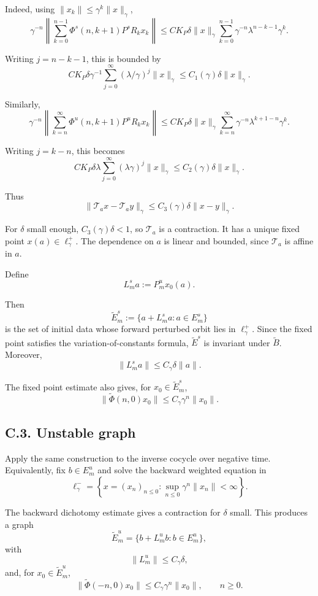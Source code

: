 \documentclass[12pt,a4paper]{article}
\theoremstyle{plain}
\numberwithin{equation}{section}
\numberwithin{theorem}{section}
\begin{document}
Indeed, using $\|x_k\|\le\gamma^k\|x\|_\gamma$,
\[
\gamma^{-n}
\left\|
\sum_{k=0}^{n-1}
\Phi^s(n,k+1)P^sR_kx_k
\right\|
\le
C K_P\delta\|x\|_\gamma
\sum_{k=0}^{n-1}
\gamma^{-n}\lambda^{n-k-1}
\gamma^k.
\]

Writing $j=n-k-1$, this is bounded by
\[
C K_P\delta\gamma^{-1}
\sum_{j=0}^{\infty}(\lambda/\gamma)^j
\|x\|_\gamma
\le
C_1(\gamma)\delta\|x\|_\gamma.
\]

Similarly,
\[
\gamma^{-n}
\left\|
\sum_{k=n}^{\infty}
\Phi^u(n,k+1)P^uR_kx_k
\right\|
\le
C K_P\delta\|x\|_\gamma
\sum_{k=n}^{\infty}
\gamma^{-n}\lambda^{k+1-n}
\gamma^k.
\]

Writing $j=k-n$, this becomes
\[
C K_P\delta\lambda
\sum_{j=0}^{\infty}(\lambda\gamma)^j
\|x\|_\gamma
\le
C_2(\gamma)\delta\|x\|_\gamma.
\]

Thus
\[
\|\mathcal T_a x-\mathcal T_a y\|_\gamma
\le
C_3(\gamma)\delta\|x-y\|_\gamma.
\]

For $\delta$ small enough, $C_3(\gamma)\delta<1$, so $\mathcal T_a$ is a contraction. It has a unique fixed point $x(a)\in\ell_\gamma^+$. The dependence on $a$ is linear and bounded, since $\mathcal T_a$ is affine in $a$.

Define
\[
L_m^s a:=P_m^u x_0(a).
\]

Then
\[
\widetilde E_m^s:=\{a+L_m^s a:a\in E_m^s\}
\]
is the set of initial data whose forward perturbed orbit lies in $\ell_\gamma^+$. Since the fixed point satisfies the variation-of-constants formula, $\widetilde E^s$ is invariant under $\widetilde B$. Moreover,
\[
\|L_m^s a\|
\le C_\gamma\delta\|a\|.
\]

The fixed point estimate also gives, for $x_0\in\widetilde E_m^s$,
\[
\|\widetilde\Phi(n,0)x_0\|
\le
C_\gamma\gamma^n\|x_0\|.
\]

\subsection{C.3. Unstable graph}

Apply the same construction to the inverse cocycle over negative time. Equivalently, fix $b\in E_m^u$ and solve the backward weighted equation in
\[
\ell_\gamma^-=
\left\{
x=(x_n)_{n\le0}:
\sup_{n\le0}\gamma^{n}\|x_n\|<\infty
\right\}.
\]

The backward dichotomy estimate gives a contraction for $\delta$ small. This produces a graph
\[
\widetilde E_m^u=
\{b+L_m^u b:b\in E_m^u\},
\]
with
\[
\|L_m^u\|
\le C_\gamma\delta,
\]
and, for $x_0\in\widetilde E_m^u$,
\[
\|\widetilde\Phi(-n,0)x_0\|
\le
C_\gamma\gamma^n\|x_0\|,
\qquad n\ge0.
\]
\end{document}
